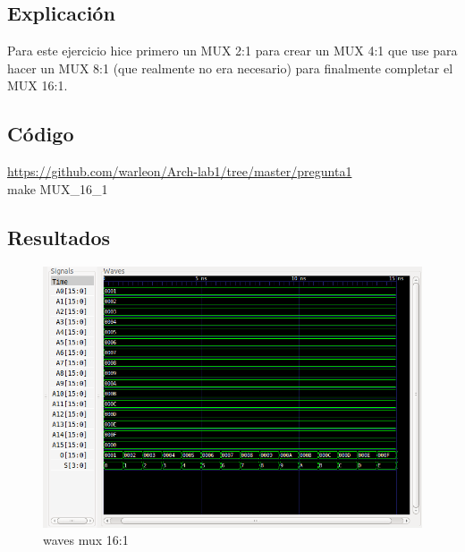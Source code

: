 \subsection*{Explicación}
Para este ejercicio hice primero un MUX 2:1 para crear un MUX 4:1 que use para hacer un MUX 8:1 (que realmente no era necesario) para finalmente completar el MUX 16:1.
\subsection*{Código}
\faGithub \space
\href{https://github.com/warleon/Arch-lab1/tree/master/pregunta1}{https://github.com/warleon/Arch-lab1/tree/master/pregunta1}\\
make MUX\_16\_1



\subsection*{Resultados}
\begin{figure}[h]
    \centering
    \includegraphics[scale=0.6]{fotos/resultados/arki-MUX_16_1.png}
    \caption{waves mux 16:1}
\end{figure}